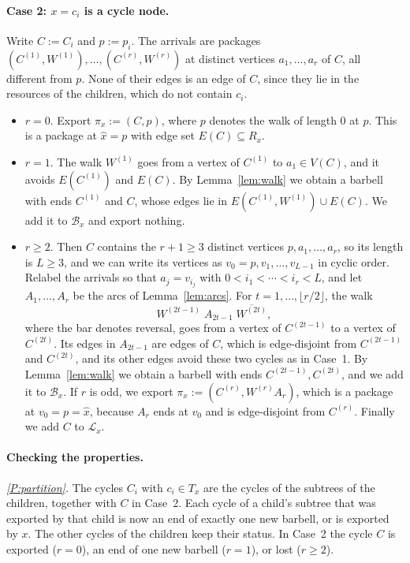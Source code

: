 \documentclass[11pt,a4paper]{article}
\theoremstyle{definition}
\theoremstyle{remark}
\begin{document}
\paragraph{Case 2: \(x=c_i\) is a cycle node.}
Write \(C:=C_i\) and \(p:=p_i\). The arrivals are packages
\((C^{(1)},W^{(1)}),\dots,(C^{(r)},W^{(r)})\) at distinct vertices
\(a_1,\dots,a_r\) of \(C\), all different from \(p\). None of their edges is an
edge of \(C\), since they lie in the resources of the children, which do not
contain \(c_i\).
\begin{itemize}
\item \(r=0\). Export \(\pi_x:=(C,p)\), where \(p\) denotes the walk of length
  \(0\) at \(p\). This is a package at \(\hat x=p\) with edge set
  \(E(C)\subseteq R_x\).
\item \(r=1\). The walk \(W^{(1)}\) goes from a vertex of \(C^{(1)}\) to
  \(a_1\in V(C)\), and it avoids \(E(C^{(1)})\) and \(E(C)\). By
  Lemma~\ref{lem:walk} we obtain a barbell with ends \(C^{(1)}\) and \(C\),
  whose edges lie in \(E(C^{(1)},W^{(1)})\cup E(C)\). We add it to
  \(\mathcal B_x\) and export nothing.
\item \(r\ge2\). Then \(C\) contains the \(r+1\ge3\) distinct vertices
  \(p,a_1,\dots,a_r\), so its length is \(L\ge3\), and we can write its
  vertices as \(v_0=p,v_1,\dots,v_{L-1}\) in cyclic order. Relabel the arrivals
  so that \(a_j=v_{i_j}\) with \(0<i_1<\cdots<i_r<L\), and let
  \(A_1,\dots,A_r\) be the arcs of Lemma~\ref{lem:arcs}. For
  \(t=1,\dots,\lfloor r/2\rfloor\), the walk
  \[
    W^{(2t-1)}\;A_{2t-1}\;\overline{W^{(2t)}},
  \]
  where the bar denotes reversal, goes from a vertex of \(C^{(2t-1)}\) to a
  vertex of \(C^{(2t)}\). Its edges in \(A_{2t-1}\) are edges of \(C\), which
  is edge-disjoint from \(C^{(2t-1)}\) and \(C^{(2t)}\), and its other edges
  avoid these two cycles as in Case~1. By Lemma~\ref{lem:walk} we obtain a
  barbell with ends \(C^{(2t-1)},C^{(2t)}\), and we add it to
  \(\mathcal B_x\). If \(r\) is odd, we export
  \(\pi_x:=(C^{(r)},W^{(r)}A_r)\), which is a package at \(v_0=p=\hat x\),
  because \(A_r\) ends at \(v_0\) and is edge-disjoint from \(C^{(r)}\).
  Finally we add \(C\) to \(\mathcal L_x\).
\end{itemize}

\paragraph{Checking the properties.}
\emph{\ref{P:partition}.} The cycles \(C_i\) with \(c_i\in T_x\) are the cycles
of the subtrees of the children, together with \(C\) in Case~2. Each cycle of
a child's subtree that was exported by that child is now an end of exactly one
new barbell, or is exported by \(x\). The other cycles of the children keep
their status. In Case~2 the cycle \(C\) is exported (\(r=0\)), an end of one
new barbell (\(r=1\)), or lost (\(r\ge2\)).
\end{document}
